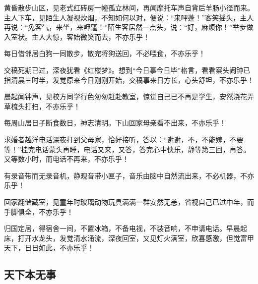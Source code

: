 \par 黄昏散步山区，见老式红砖房一幢孤立林间，再闻摩托车声自背后羊肠小径而来。主人下车，见陌生人凝视炊烟，不知如何以对，便说：“来呷蓬！”客笑摇头，主人再说：“免客气，来坐，来呷蓬！”陌生客居然一点头，说：“好，麻烦你！”举步做入室状。主人大惊，客始微笑而去，不亦乐乎！
\par 每日借邻居白狗一同散步，散完将狗送回，不必喂食，不亦乐乎！
\par 交稿死期已过，深夜犹看《红楼梦》。想到“今日事今日毕”格言，看看案头闹钟已指清晨三时半，发觉原来今日刚刚开始，交稿事来日方长，心头舒坦，不亦乐乎！
\par 晨起闻钟声，见校方同学行色匆匆赶赴教室，惊觉自己已不再是学生，安然浇花弄草梳头打扫，不亦乐乎！
\par 每周山居日子断食数日，神志清明。下山回家母亲看不出来，不亦乐乎！
\par 求婚者越洋电话深夜打到父母家，恰好接听，答以：“谢谢，不，不能嫁，不要等！”挂完电话蒙头再睡，电话又来，又答，答完心中快乐，静等第三回，再答。又等数小时，而电话不再来，不亦乐乎！
\par 有录音带而无录音机，静观音带小匣子，音乐由脑中自然流出来，不必机器，不亦乐乎！
\par 回家翻储藏室，见童年时玻璃动物玩具满满一群安然无恙，省视自己已过中年，而手脚俱全，不亦乐乎！
\par 归国定居，得宿舍一间，不置冰箱，不备电视，不装音响，不申请电话。早晨起床，打开水龙头，发觉清水涌流，深夜回室，又见灯火满室，欣喜感激，但觉富甲天下，日日如此，不亦乐乎！



\subsection{天下本无事}


